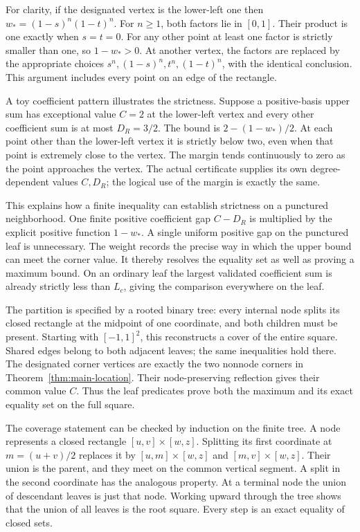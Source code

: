For clarity, if the designated vertex is the lower-left one then
$w_*=(1-s)^n(1-t)^n$. For $n\geq1$, both factors lie in $[0,1]$.
Their product is one exactly when $s=t=0$. For any other point at
least one factor is strictly smaller than one, so $1-w_*>0$. At
another vertex, the factors are replaced by the appropriate choices
$s^n,(1-s)^n,t^n,(1-t)^n$, with the identical conclusion. This
argument includes every point on an edge of the rectangle.

A toy coefficient pattern illustrates the strictness. Suppose a
positive-basis upper sum has exceptional value $C=2$ at the lower-left
vertex and every other coefficient sum is at most $D_R=3/2$. The bound
is $2-(1-w_*)/2$. At each point other than the lower-left vertex it
is strictly below two, even when that point is extremely close to the
vertex. The margin tends continuously to zero as the point approaches
the vertex. The actual certificate supplies its own degree-dependent
values $C,D_R$; the logical use of the margin is exactly the same.

This explains how a finite inequality can establish strictness on a
punctured neighborhood. One finite positive coefficient gap
$C-D_R$ is multiplied by the explicit positive function $1-w_*$.
A single uniform positive gap on the punctured leaf is unnecessary.
The weight records the precise way in which the upper bound can meet
the corner value. It thereby resolves the equality set as well as
proving a maximum bound.
On an ordinary leaf the largest validated coefficient sum is already
strictly less than $L_c$, giving the comparison everywhere on the leaf.

The partition is specified by a rooted binary tree: every internal node
splits its closed rectangle at the midpoint of one coordinate, and both
children must be present. Starting with $[-1,1]^2$, this reconstructs a
cover of the entire square. Shared edges belong to both adjacent leaves;
the same inequalities hold there. The designated corner vertices are
exactly the two nonnode corners in Theorem~\ref{thm:main-location}.
Their node-preserving reflection gives their common value $C$.
Thus the leaf predicates prove both the maximum and its exact equality
set on the full square.

The coverage statement can be checked by induction on the finite tree.
A node represents a closed rectangle $[u,v]\times[w,z]$. Splitting
its first coordinate at $m=(u+v)/2$ replaces it by
$[u,m]\times[w,z]$ and $[m,v]\times[w,z]$. Their union is the
parent, and they meet on the common vertical segment. A split in the
second coordinate has the analogous property. At a terminal node the
union of descendant leaves is just that node. Working upward through
the tree shows that the union of all leaves is the root square.
Every step is an exact equality of closed sets.

